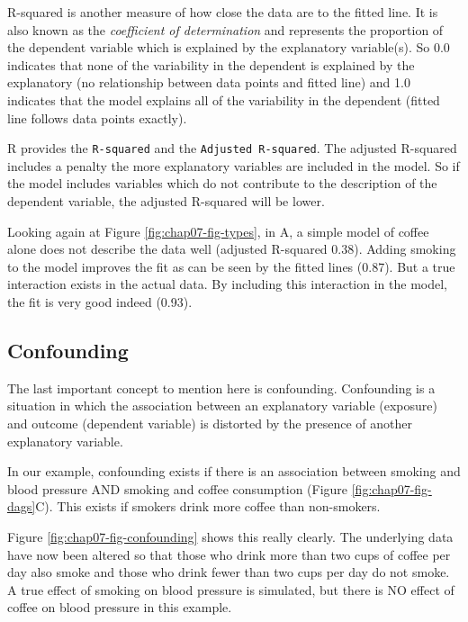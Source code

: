 \documentclass[
  12pt,
  krantz2]{krantz}
\begin{document}
R-squared is another measure of how close the data are to the fitted line.
It is also known as the \emph{coefficient of determination} and represents the proportion of the dependent variable which is explained by the explanatory variable(s).
So 0.0 indicates that none of the variability in the dependent is explained by the explanatory (no relationship between data points and fitted line) and 1.0 indicates that the model explains all of the variability in the dependent (fitted line follows data points exactly).

R provides the \texttt{R-squared} and the \texttt{Adjusted\ R-squared}.
The adjusted R-squared includes a penalty the more explanatory variables are included in the model.
So if the model includes variables which do not contribute to the description of the dependent variable, the adjusted R-squared will be lower.

Looking again at Figure \ref{fig:chap07-fig-types}, in A, a simple model of coffee alone does not describe the data well (adjusted R-squared 0.38).
Adding smoking to the model improves the fit as can be seen by the fitted lines (0.87).
But a true interaction exists in the actual data.
By including this interaction in the model, the fit is very good indeed (0.93).

\hypertarget{chap07-confound}{%
\subsection{Confounding}\label{chap07-confound}}


The last important concept to mention here is confounding.
Confounding is a situation in which the association between an explanatory variable (exposure) and outcome (dependent variable) is distorted by the presence of another explanatory variable.

In our example, confounding exists if there is an association between smoking and blood pressure AND smoking and coffee consumption (Figure \ref{fig:chap07-fig-dags}C).
This exists if smokers drink more coffee than non-smokers.

Figure \ref{fig:chap07-fig-confounding} shows this really clearly.
The underlying data have now been altered so that those who drink more than two cups of coffee per day also smoke and those who drink fewer than two cups per day do not smoke.
A true effect of smoking on blood pressure is simulated, but there is NO effect of coffee on blood pressure in this example.
\end{document}
